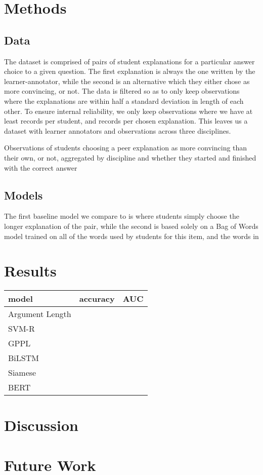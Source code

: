 \documentclass[runningheads]{llncs}
\begin{document}
\section{Methods}

\subsection{Data}
The dataset is comprised of pairs of student explanations for a particular 
answer choice to a given question. The first explanation is always the one 
written by the learner-annotator, while the second is an alternative which 
they either chose as more convincing, or not. The data is filtered so as 
to only keep observations where the explanations are within half a standard 
deviation in length of each other. To ensure internal reliability, we only keep 
observations where we have at least  
records per 
student, and  records per chosen 
explanation. This leaves us a dataset with  
learner annotators and  observations across three disciplines.
\begin{table}

\caption{Observations of students choosing a peer explanation as more 
convincing than their own, or not, aggregated by discipline and whether they 
started and finished with the correct answer}
\end{table}

\subsection{Models}
The first baseline model we compare to is where students simply choose the 
longer explanation of the pair, while the second is based solely on a Bag of 
Words model trained on all of the words used by students for this item, and the 
words in 


\section{Results}
\begin{table}
	\begin{tabular}{l|l|l}
		\toprule
		model & accuracy & AUC \\
		\toprule
		Argument Length &  &  \\
		SVM-R &  &  \\
		GPPL & & \\
		BiLSTM & & \\
		Siamese &  &  \\
		BERT & & \\	
	\end{tabular}
\end{table}
\section{Discussion}

\section{Future Work}

 
 
\end{document}
